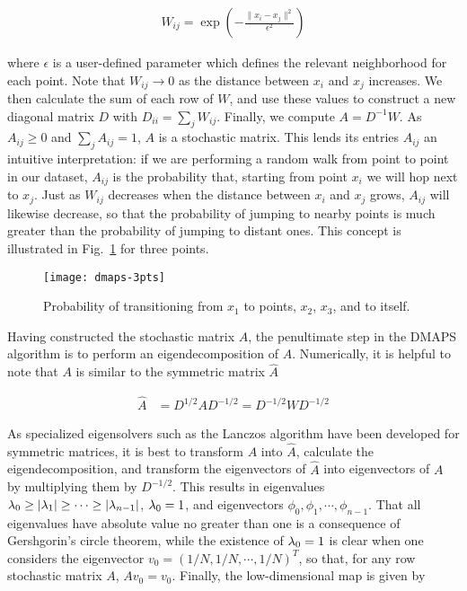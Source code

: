 \begin{align*}
  W_{ij} = \exp \left( -\frac{\|x_i - x_j\|^2}{\epsilon^2} \right)
\end{align*}

where $\epsilon$ is a user-defined parameter which defines the
relevant neighborhood for each point. Note that $W_{ij} \rightarrow 0$
as the distance between $x_i$ and $x_j$ increases. We then calculate
the sum of each row of $W$, and use these values to construct a new
diagonal matrix $D$ with $D_{ii} = \sum_j W_{ij}$. Finally, we compute
$A = D^{-1} W$. As $A_{ij} \ge 0$ and $\sum_j A_{ij} = 1$, $A$ is a
stochastic matrix. This lends its entries $A_{ij}$ an intuitive
interpretation: if we are performing a random walk from point to point
in our dataset, $A_{ij}$ is the probability that, starting from point
$x_i$ we will hop next to $x_j$. Just as $W_{ij}$ decreases when the
distance between $x_i$ and $x_j$ grows, $A_{ij}$ will likewise
decrease, so that the probability of jumping to nearby points is much
greater than the probability of jumping to distant ones. This concept
is illustrated in Fig.~\ref{fig:dmaps-3pts} for three points.

\begin{figure}
  \centering
  \texttt{[image: dmaps-3pts]}
  \caption[Illustration of random walk on data]{Probability of
    transitioning from $x_1$ to points, $x_2$, $x_3$, and to
    itself. \label{fig:dmaps-3pts}}
\end{figure}


Having constructed the stochastic matrix $A$, the penultimate step in
the DMAPS algorithm is to perform an eigendecomposition of
$A$. Numerically, it is helpful to note that $A$ is similar to the
symmetric matrix $\hat{A}$

\begin{align*}
  \hat{A} &= D^{1/2}A D^{-1/2} = D^{-1/2} W D^{-1/2}
\end{align*}

As specialized eigensolvers such as the Lanczos algorithm have been
developed for symmetric matrices, it is best to transform $A$ into
$\hat{A}$, calculate the eigendecomposition, and transform the
eigenvectors of $\hat{A}$ into eigenvectors of $A$ by multiplying them
by $D^{-1/2}$. This results in eigenvalues
$\lambda_0 \ge |\lambda_1| \ge \cdots \ge |\lambda_{n-1}|$, $\lambda_0 = 1$, and
eigenvectors $\phi_0, \phi_1, \cdots, \phi_{n-1}$. That
all eigenvalues have absolute value no greater than one is a
consequence of Gershgorin's circle theorem, while the existence of
$\lambda_0 = 1$ is clear when one considers the eigenvector
$v_0 = (1/N, 1/N, \cdots, 1/N)^T$, so that, for any row stochastic
matrix $A$, $A v_0 =  v_0$. Finally, the low-dimensional map is
given by

